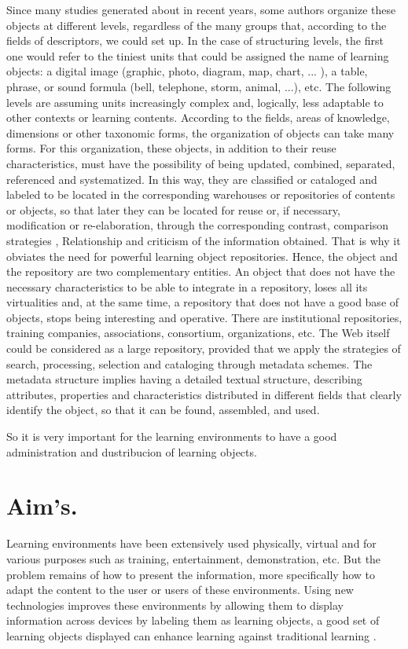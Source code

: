 Since many studies generated about in recent years, some authors organize these objects at different levels, regardless of the many groups that, according to the fields of descriptors, we could set up. In the case of structuring levels, the first one would refer to the tiniest units that could be assigned the name of learning objects: a digital image (graphic, photo, diagram, map, chart, ... ), a table, phrase, or sound formula (bell, telephone, storm, animal, ...), etc. The following levels are assuming units increasingly complex and, logically, less adaptable to other contexts or learning contents. According to the fields, areas of knowledge, dimensions or other taxonomic forms, the organization of objects can take many forms. For this organization, these objects, in addition to their reuse characteristics, must have the possibility of being updated, combined, separated, referenced and systematized. In this way, they are classified or cataloged and labeled to be located in the corresponding warehouses or repositories of contents or objects, so that later they can be located for reuse or, if necessary, modification or re-elaboration, through the corresponding contrast, comparison strategies , Relationship and criticism of the information obtained. That is why it obviates the need for powerful learning object repositories. Hence, the object and the repository are two complementary entities. An object that does not have the necessary characteristics to be able to integrate in a repository, loses all its virtualities and, at the same time, a repository that does not have a good base of objects, stops being interesting and operative. There are institutional repositories, training companies, associations, consortium, organizations, etc. The Web itself could be considered as a large repository, provided that we apply the strategies of search, processing, selection and cataloging through metadata schemes. The metadata structure implies having a detailed textual structure, describing attributes, properties and characteristics distributed in different fields that clearly identify the object, so that it can be found, assembled, and used. 

So it is very important for the learning environments to have a good administration and dustribucion of learning objects.


\section{Aim's.}

Learning environments have been extensively used physically, virtual and for various purposes such as training, entertainment, demonstration, etc.
But the problem remains of how to present the information, more specifically how to adapt the content to the user or users of these environments.
Using new technologies improves these environments by allowing them to display information across devices by labeling them as learning objects, a good set of learning objects displayed can enhance learning against traditional learning \cite{Chen2007}.


